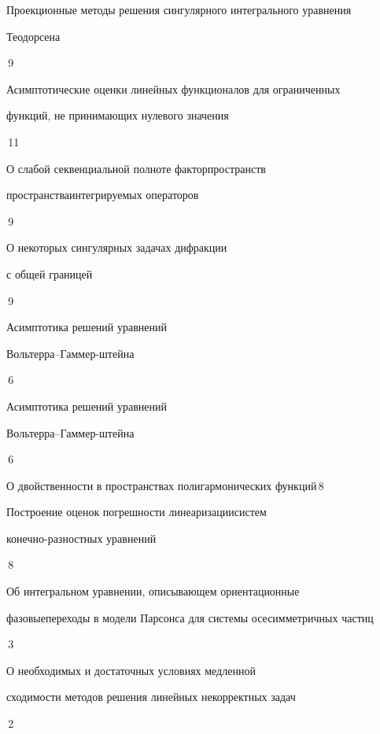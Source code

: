 

{Проекционные методы решения сингулярного интегрального уравнения \newline


Теодорсена}{\No\,9}




{Асимптотические оценки линейных функционалов для ограниченных \newline


функций, не принимающих нулевого значения}{\No\,11}




{О слабой секвенциальной полноте факторпространств


пространства\newline интегрируемых операторов}{\No\,9}




{О некоторых сингулярных задачах дифракции 


с общей границей}{\No\,9}




{Асимптотика решений уравнений


Вольтерра--Гаммер-\newline штейна}{\No\,6}




{Асимптотика решений уравнений


Вольтерра--Гаммер-\newline штейна}{\No\,6}




{О двойственности в пространствах полигармонических функций}{\No\,8}




{Построение оценок погрешности линеаризации\newline систем 


конечно-разностных уравнений}{\No\,8}




{Об интегральном уравнении, описывающем ориентационные


фазовые\newline переходы в модели Парсонса для системы осесимметричных частиц}{\No\,3}




{О необходимых и достаточных условиях медленной\newline


сходимости методов решения линейных некорректных задач}{\No\,2}





